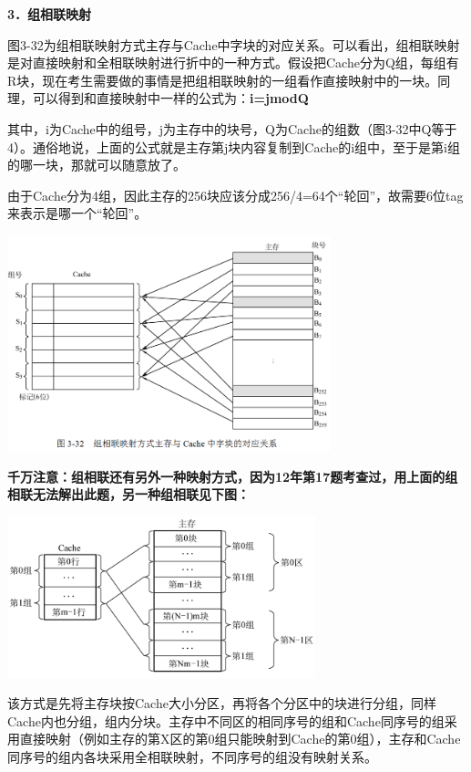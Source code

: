 \textbf{3．组相联映射}

图3-32为组相联映射方式主存与Cache中字块的对应关系。可以看出，组相联映射是对直接映射和全相联映射进行折中的一种方式。假设把Cache分为Q组，每组有R块，现在考生需要做的事情是把组相联映射的一组看作直接映射中的一块。同理，可以得到和直接映射中一样的公式为：\textbf{i=jmodQ}

其中，i为Cache中的组号，j为主存中的块号，Q为Cache的组数（图3-32中Q等于4）。通俗地说，上面的公式就是主存第j块内容复制到Cache的i组中，至于是第i组的哪一块，那就可以随意放了。

由于Cache分为4组，因此主存的256块应该分成256/4=64个``轮回''，故需要6位tag来表示是哪一个``轮回''。

\includegraphics[width=3.69792in,height=2.45833in]{png-jpeg-pics/44C23D729B6DD2ACE9D0F48F87404873.png}

{\textbf{千万注意：组相联还有另外一种映射方式，因为12年第17题考查过，用上面的组相联无法解出此题，另一种组相联见下图：}}

\includegraphics[width=3.52083in,height=1.84375in]{png-jpeg-pics/6C28359075578819B57C725544B589AE.png}

该方式是先将主存块按{Cache}大小分区，再将各个分区中的块进行分组，同样{Cache}内也分组，组内分块。主存中不同区的相同序号的组和{Cache}同序号的组采用直接映射（例如主存的第{X}区的第{0}组只能映射到{Cache}的第{0}组），主存和{Cache}同序号的组内各块采用全相联映射，不同序号的组没有映射关系。{}
